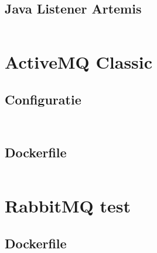 \subsection{Java Listener Artemis}\label{sec:listener_artemis}
\inputminted{java}{../tests/listener/artemis-listener/demo/src/main/java/com/example/ArtemisSocketBridge.java}



\section{ActiveMQ Classic}\label{sec:code_amq}

\subsection{Configuratie}\label{sec:config_activemq}
\inputminted{java}{../tests/messaging/activemq-server/activemq.xml}

\inputminted{java}{../tests/messaging/activemq-server/setenv}

\subsection{Dockerfile}\label{sec:docker_amq}
\inputminted{python3}{../tests/messaging/activemq-server/Dockerfile}


\section{RabbitMQ test}\label{sec:code_rabbitmq}

\subsection{Dockerfile}\label{sec:docker_rabbitmq}
\inputminted{python3}{../tests/messaging/rabbitmq-server/Dockerfile}


